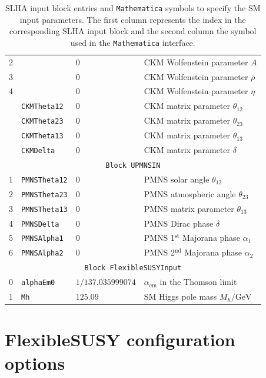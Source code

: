 \documentclass[final,3p,11pt,pdflatex]{elsarticle}
\newcommand{\mathematica}{\texttt{Ma\-the\-ma\-ti\-ca}\xspace}
\newcommand{\code}[1]{\lstinline|#1|}  %
\def\aem{\alpha_{\text{em}}}
\begin{document}
\begin{table}[tbh!]
{\begin{tabular}{llll}
     2 & & $0$ & CKM Wolfenstein parameter $A$ \\
     3 & & $0$ & CKM Wolfenstein parameter $\bar{\rho}$ \\
     4 & & $0$ & CKM Wolfenstein parameter $\eta$ \\
    \midrule
       & \code{CKMTheta12} & $0$ & CKM matrix parameter $\theta_{12}$ \\
       & \code{CKMTheta23} & $0$ & CKM matrix parameter $\theta_{23}$ \\
       & \code{CKMTheta13} & $0$ & CKM matrix parameter $\theta_{13}$ \\
       & \code{CKMDelta} & $0$ & CKM matrix parameter $\delta$ \\
    \midrule
    \multicolumn{4}{c}{\texttt{Block UPMNSIN}}\\
    \midrule
     1 & \code{PMNSTheta12} & $0$ & PMNS solar angle $\theta_{12}$ \\
     2 & \code{PMNSTheta23} & $0$ & PMNS atmospheric angle $\theta_{23}$ \\
     3 & \code{PMNSTheta13} & $0$ & PMNS matrix parameter $\theta_{13}$ \\
     4 & \code{PMNSDelta}   & $0$ & PMNS Dirac phase $\delta$ \\
     5 & \code{PMNSAlpha1}  & $0$ & PMNS 1$^\text{st}$ Majorana phase $\alpha_1$ \\
     6 & \code{PMNSAlpha2}  & $0$ & PMNS 2$^\text{nd}$ Majorana phase $\alpha_2$ \\
    \midrule
    \multicolumn{4}{c}{\texttt{Block FlexibleSUSYInput}}\\
    \midrule
     0 & \code{alphaEm0} & $1/137.035999074$ & $\aem$ in the Thomson limit \\
     1 & \code{Mh} & $125.09$ & SM Higgs pole mass $M_h/\text{GeV}$ \\
    \bottomrule
  \end{tabular}}
  \caption{SLHA input block entries and \mathematica symbols to
    specify the SM input parameters.  The first column
    represents the index in the corresponding SLHA input block and the
    second column the symbol used in the \mathematica interface.}
  \label{tab:sm_mma_options}
\end{table}

\section{FlexibleSUSY configuration options}
\label{app:fs_config_options}
\end{document}
